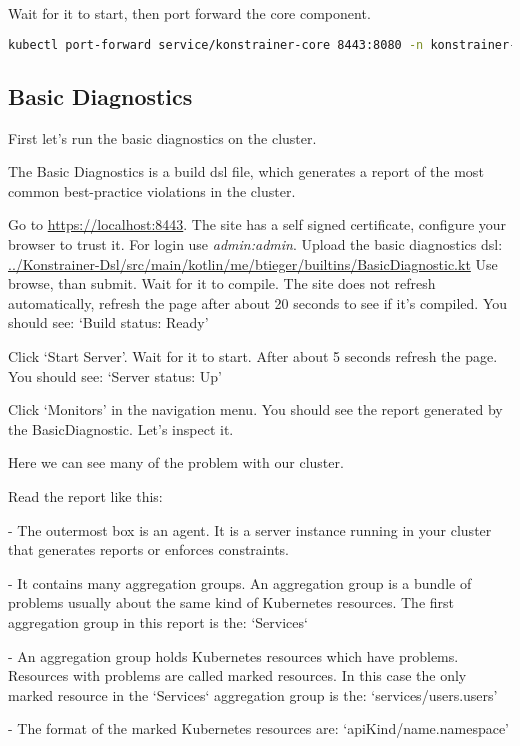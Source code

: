 Wait for it to start, then port forward the core component.

\begin{lstlisting}[caption={TODO},language=bash,label=code:bashx]
kubectl port-forward service/konstrainer-core 8443:8080 -n konstrainer-ns
\end{lstlisting}

\subsection{Basic Diagnostics}

First let's run the basic diagnostics on the cluster.

The Basic Diagnostics is a build dsl file, which generates a report of the most common best-practice violations in the cluster.

Go to \url{https://localhost:8443}. The site has a self signed certificate, configure your browser to trust it. For login use \emph{admin:admin}. Upload the basic diagnostics dsl:
\url{../Konstrainer-Dsl/src/main/kotlin/me/btieger/builtins/BasicDiagnostic.kt}
Use browse, than submit. Wait for it to compile. The site does not refresh automatically, refresh the page after about 20 seconds to see if it's compiled. You should see: `Build status: Ready'

Click `Start Server'. Wait for it to start. After about 5 seconds refresh the page. You should see: `Server status: Up'

Click `Monitors' in the navigation menu. You should see the report generated by the BasicDiagnostic. Let's inspect it.

Here we can see many of the problem with our cluster.

Read the report like this:

- The outermost box is an agent. It is a server instance running in your cluster that generates reports or enforces constraints.

- It contains many aggregation groups. An aggregation group is a bundle of problems usually about the same kind of Kubernetes resources. The first aggregation group in this report is the: `Services`

  - An aggregation group holds Kubernetes resources which have problems. Resources with problems are called marked resources. In this case the only marked resource in the `Services` aggregation group is the: `services/users.users'

  - The format of the marked Kubernetes resources are: `apiKind/name.namespace'

